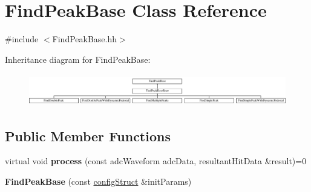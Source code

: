 \hypertarget{class_find_peak_base}{}\section{Find\+Peak\+Base Class Reference}
\label{class_find_peak_base}


{\ttfamily \#include $<$Find\+Peak\+Base.\+hh$>$}

Inheritance diagram for Find\+Peak\+Base\+:\begin{figure}[H]
\begin{center}
\leavevmode
\includegraphics[height=1.435897cm]{class_find_peak_base}
\end{center}
\end{figure}
\subsection*{Public Member Functions}
\begin{DoxyCompactItemize}
\item 
\hypertarget{class_find_peak_base_a59ec4911e522e1814a052ffa7d8f46f8}{}virtual void {\bfseries process} (const adc\+Waveform adc\+Data, resultant\+Hit\+Data \&result)=0\label{class_find_peak_base_a59ec4911e522e1814a052ffa7d8f46f8}

\item 
\hypertarget{class_find_peak_base_a8d291602ae052dcf9f9c15c818400c43}{}{\bfseries Find\+Peak\+Base} (const \hyperlink{structconfig_struct}{config\+Struct} \&init\+Params)\label{class_find_peak_base_a8d291602ae052dcf9f9c15c818400c43}

\end{DoxyCompactItemize}
